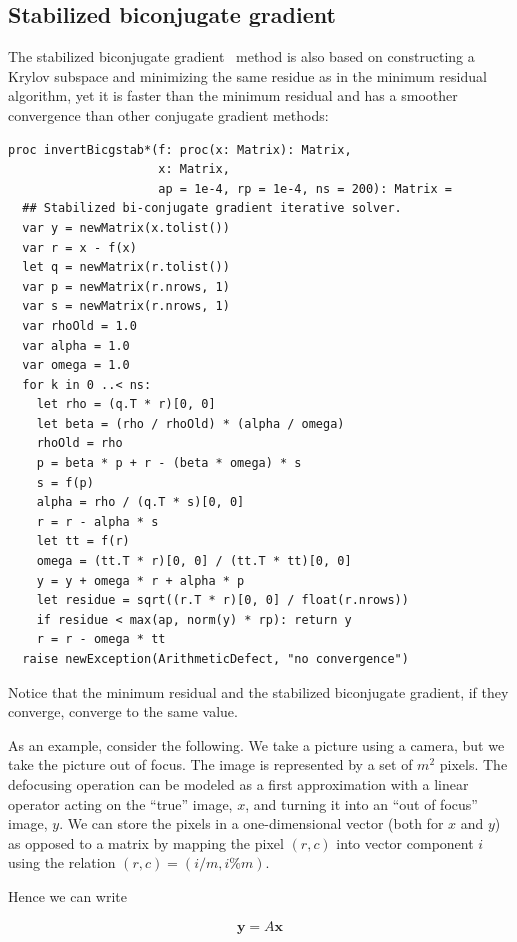 \documentclass[justified, sixbynine]{tufte-book}
\def\ft{\small\tt}
\theoremstyle{plain}%
\newtheorem * {corollary}{Corollary}
\theoremstyle{definition}
\theoremstyle{remark}
\newtheorem * {remark}{Remark}
\newtheorem * {note}{Note}
\begin{document}
\begin{fullwidth}
\goodbreak\subsection{Stabilized biconjugate gradient}


The stabilized biconjugate gradient~\cite{bicgstab} method is also based on constructing a Krylov subspace and minimizing the same residue as in the minimum residual algorithm, yet it is faster than the minimum residual and has a smoother convergence than other conjugate gradient methods:

\begin{lstlisting}[caption={in file: {\ft nlib.nim}}]
proc invertBicgstab*(f: proc(x: Matrix): Matrix,
                     x: Matrix,
                     ap = 1e-4, rp = 1e-4, ns = 200): Matrix =
  ## Stabilized bi-conjugate gradient iterative solver.
  var y = newMatrix(x.tolist())
  var r = x - f(x)
  let q = newMatrix(r.tolist())
  var p = newMatrix(r.nrows, 1)
  var s = newMatrix(r.nrows, 1)
  var rhoOld = 1.0
  var alpha = 1.0
  var omega = 1.0
  for k in 0 ..< ns:
    let rho = (q.T * r)[0, 0]
    let beta = (rho / rhoOld) * (alpha / omega)
    rhoOld = rho
    p = beta * p + r - (beta * omega) * s
    s = f(p)
    alpha = rho / (q.T * s)[0, 0]
    r = r - alpha * s
    let tt = f(r)
    omega = (tt.T * r)[0, 0] / (tt.T * tt)[0, 0]
    y = y + omega * r + alpha * p
    let residue = sqrt((r.T * r)[0, 0] / float(r.nrows))
    if residue < max(ap, norm(y) * rp): return y
    r = r - omega * tt
  raise newException(ArithmeticDefect, "no convergence")
\end{lstlisting}

Notice that the minimum residual and the stabilized biconjugate gradient, if they converge, converge to the same value.

As an example, consider the following. We take a picture using a camera, but we take the picture out of focus. The image is represented by a set of $m^2$ pixels. The defocusing operation can be modeled as a first approximation with a linear operator acting on the ``true'' image, $x$, and turning it into an ``out of focus'' image, $y$. We can store the pixels in a one-dimensional vector (both for $x$ and $y$) as opposed to a matrix by mapping the pixel $(r, c)$ into vector component $i$ using the relation $(r, c) = (i/m, i\%m)$.

Hence we can write

\begin{equation}
\mathbf{y} = A \mathbf{x}
\end{equation}


\end{fullwidth}
\end{document}
